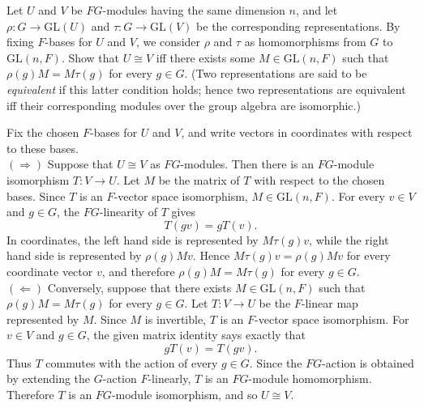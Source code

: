 \documentclass[../Odyssey_Project.tex]{subfiles}
\begin{document}
\begin{exercise}
\label{ex:12.1}
Let $U$ and $V$ be $FG$-modules having the same dimension $n$, and let $\rho \colon G \to \mathrm{GL}(U)$ and $\tau \colon G \to \mathrm{GL}(V)$ be the corresponding representations. By fixing $F$-bases for $U$ and $V$, we consider $\rho$ and $\tau$ as homomorphisms from $G$ to $\mathrm{GL}(n, F)$. Show that $U \cong V$ iff there exists some $M \in \mathrm{GL}(n, F)$ such that $\rho(g) M = M \tau(g)$ for every $g \in G$. (Two representations are said to be \emph{equivalent} if this latter condition holds; hence two representations are equivalent iff their corresponding modules over the group algebra are isomorphic.)
\end{exercise}
\begin{solution}
    Fix the chosen $F$-bases for $U$ and $V$, and write vectors in coordinates with respect to these bases.\\
    $(\Rightarrow)$ Suppose that $U \cong V$ as $FG$-modules. Then there is an $FG$-module isomorphism $T \colon V \to U$. Let $M$ be the matrix of $T$ with respect to the chosen bases. Since $T$ is an $F$-vector space isomorphism, $M \in \mathrm{GL}(n,F)$. For every $v \in V$ and $g \in G$, the $FG$-linearity of $T$ gives
    \[
        T(gv) = gT(v).
    \]
    In coordinates, the left hand side is represented by $M\tau(g)v$, while the right hand side is represented by $\rho(g)Mv$. Hence $M\tau(g)v = \rho(g)Mv$ for every coordinate vector $v$, and therefore $\rho(g)M = M\tau(g)$ for every $g \in G$.\\
    $(\Leftarrow)$ Conversely, suppose that there exists $M \in \mathrm{GL}(n,F)$ such that $\rho(g)M = M\tau(g)$ for every $g \in G$. Let $T \colon V \to U$ be the $F$-linear map represented by $M$. Since $M$ is invertible, $T$ is an $F$-vector space isomorphism. For $v \in V$ and $g \in G$, the given matrix identity says exactly that
    \[
        gT(v) = T(gv).
    \]
    Thus $T$ commutes with the action of every $g \in G$. Since the $FG$-action is obtained by extending the $G$-action $F$-linearly, $T$ is an $FG$-module homomorphism. Therefore $T$ is an $FG$-module isomorphism, and so $U \cong V$.
\end{solution}
\end{document}
